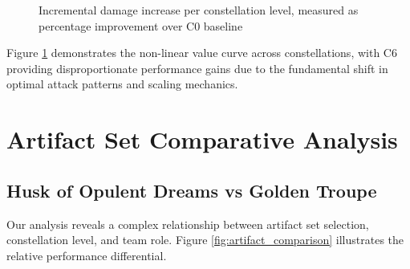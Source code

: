 \documentclass[12pt,a4paper]{article}
\begin{document}
\begin{figure}[H]
\centering
{}
\caption{Incremental damage increase per constellation level, measured as percentage improvement over C0 baseline}
\label{fig:constellation_value}
\end{figure}

Figure \ref{fig:constellation_value} demonstrates the non-linear value curve across constellations, with C6 providing disproportionate performance gains due to the fundamental shift in optimal attack patterns and scaling mechanics.

\section{Artifact Set Comparative Analysis}

\subsection{Husk of Opulent Dreams vs Golden Troupe}

Our analysis reveals a complex relationship between artifact set selection, constellation level, and team role. Figure \ref{fig:artifact_comparison} illustrates the relative performance differential.
\end{document}
